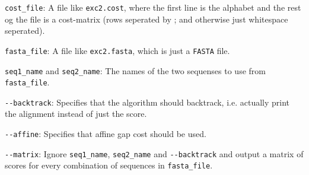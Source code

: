 \begin{description}
\item{\verb|cost_file|:} A file like \verb|exc2.cost|, where the
  first line is the alphabet and the rest og the file is a cost-matrix
  (rows seperated by ; and otherwise just whitespace seperated).
\item{\verb|fasta_file|:} A file like \verb|exc2.fasta|, which is just
  a \verb|FASTA| file.
\item{\verb|seq1_name| and \verb|seq2_name|:} The names of the two
  sequenses to use from \verb|fasta_file|.
\item{\verb|--backtrack|:} Specifies that the algorithm should
  backtrack, i.e. actually print the alignment instead of just the
  score.
\item{\verb|--affine|:} Specifies that affine gap cost should be used.
\item{\verb|--matrix|:} Ignore \verb|seq1_name|, \verb|seq2_name| and
  \verb|--backtrack| and output a matrix of scores for every
  combination of sequences in \verb|fasta_file|.
\end{description}
